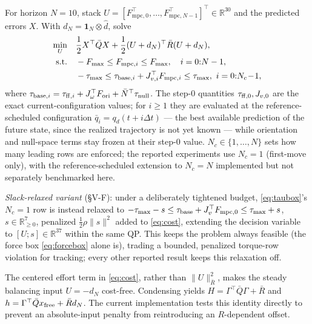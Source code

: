 \documentclass[conference]{IEEEtran}
\newcommand{\dhat}{\hat d}
\newcommand{\Nbar}{\bar N}
\begin{document}
For horizon $N=10$, stack
$U=[F_{\mathrm{mpc},0}^\top,\ldots,F_{\mathrm{mpc},N-1}^\top]^\top\in\mathbb R^{30}$ and the
predicted errors $X$. With $d_N=\bm 1_N\otimes\dhat$, solve
\begin{subequations}
\begin{align}
\min_U\quad &\frac12X^\top\bar QX+
 \frac12(U+d_N)^\top\bar R(U+d_N),\label{eq:cost}\\
\text{s.t.}\quad &-F_{\max}\le F_{\mathrm{mpc},i}\le F_{\max},\quad i=0{:}N-1,
\label{eq:forcebox}\\
&-\tau_{\max}\le\tau_{{\rm base},i}+J_{v,i}^\top F_{\mathrm{mpc},i}
\le\tau_{\max},\ i=0{:}N_c\!-\!1,\label{eq:taubox}
\end{align}
\label{eq:qp}
\end{subequations}
where $\tau_{{\rm base},i}=\tau_{{\rm ff},i}+J_\omega^\top F_{\rm ori}
+\Nbar^\top\tau_{\rm null}$. The step-0 quantities
$\tau_{{\rm ff},0},J_{v,0}$ are the exact current-configuration values; for
$i\ge1$ they are evaluated at the reference-scheduled configuration
$\bar q_i=q_d(t+i\Delta t)$ --- the best available prediction of the
future state, since the realized trajectory is not yet known --- while
orientation and null-space terms stay frozen at their step-0 value.
$N_c\in\{1,\ldots,N\}$ sets how many leading rows are enforced; the
reported experiments use $N_c=1$ (first-move only), with the
reference-scheduled extension to $N_c=N$ implemented but not separately
benchmarked here.

\emph{Slack-relaxed variant} (\S V-F): under a deliberately tightened
budget, \eqref{eq:taubox}'s $N_c=1$ row is instead relaxed to
$-\tau_{\max}-s\le\tau_{\rm base}+J_v^\top F_{\mathrm{mpc},0}\le\tau_{\max}+s$,
$s\in\mathbb R^7_{\ge0}$, penalized $\frac12\rho\|s\|^2$ added to
\eqref{eq:cost}, extending the decision variable to $[U;s]\in\mathbb
R^{37}$ within the same QP. This keeps the problem always feasible (the
force box \eqref{eq:forcebox} alone is), trading a bounded, penalized
torque-row violation for tracking; every other reported result keeps
this relaxation off.

The centered effort term in
\eqref{eq:cost}, rather than $\|U\|_{\bar R}^2$, makes the steady balancing
input $U=-d_N$ cost-free. Condensing yields
$H=\Gamma^\top\bar Q\Gamma+\bar R$ and
$h=\Gamma^\top\bar Qx_{\rm free}+\bar R d_N$. The current implementation
tests this identity directly to prevent an absolute-input penalty from
reintroducing an $R$-dependent offset.
\end{document}
